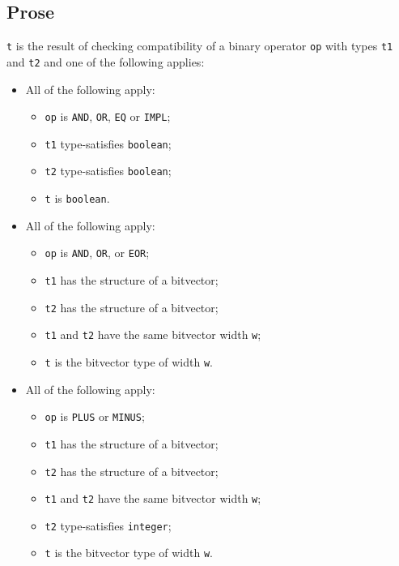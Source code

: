 \documentclass{book}
\begin{document}
\subsection{Prose}
  \texttt{t} is the result of checking compatibility of a binary operator \texttt{op} with
  types \texttt{t1} and \texttt{t2} and one of the following applies:
\begin{itemize}
  \item All of the following apply:
    \begin{itemize}
    \item \texttt{op} is \texttt{AND}, \texttt{OR}, \texttt{EQ} or \texttt{IMPL}; 
    \item \texttt{t1} type-satisfies \texttt{boolean};
    \item \texttt{t2} type-satisfies \texttt{boolean};
    \item \texttt{t} is \texttt{boolean}.
    \end{itemize}

  \item All of the following apply:
    \begin{itemize}
    \item \texttt{op} is \texttt{AND}, \texttt{OR}, or \texttt{EOR};
    \item \texttt{t1} has the structure of a bitvector;
    \item \texttt{t2} has the structure of a bitvector;
    \item \texttt{t1} and \texttt{t2} have the same bitvector width \texttt{w};
    \item \texttt{t} is the bitvector type of width \texttt{w}.
    \end{itemize}

  \item All of the following apply:
    \begin{itemize}
    \item \texttt{op} is \texttt{PLUS} or \texttt{MINUS};
    \item \texttt{t1} has the structure of a bitvector;
    \item \texttt{t2} has the structure of a bitvector;
    \item \texttt{t1} and \texttt{t2} have the same bitvector width \texttt{w};
    \item \texttt{t2} type-satisfies \texttt{integer};
    \item \texttt{t} is the bitvector type of width \texttt{w}.
    \end{itemize}


\end{itemize}
\end{document}
